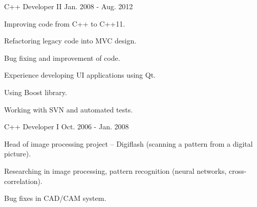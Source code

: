 \begin{cventries}
    \cventry
    {C++ Developer II} %
    {} %
    {} %
    {Jan. 2008 - Aug. 2012} %
    {
      \begin{cvitems} %
        \item {Improving code from C++ to C++11.}
        \item {Refactoring legacy code into MVC design.}
        \item {Bug fixing and improvement of code.}
        \item {Experience developing UI applications using Qt.}
        \item {Using Boost library.}
        \item {Working with SVN and automated tests.}
      \end{cvitems}
    }

    \cventry
    {C++ Developer I} %
    {} %
    {} %
    {Oct. 2006 - Jan. 2008} %
    {
      \begin{cvitems} %
        \item {Head of image processing project – Digiflash (scanning a pattern from a digital picture).}
        \item {Researching in image processing, pattern recognition (neural networks, cross-correlation).}
        \item {Bug fixes in CAD/CAM system.}
      \end{cvitems}
    }

\end{cventries}
